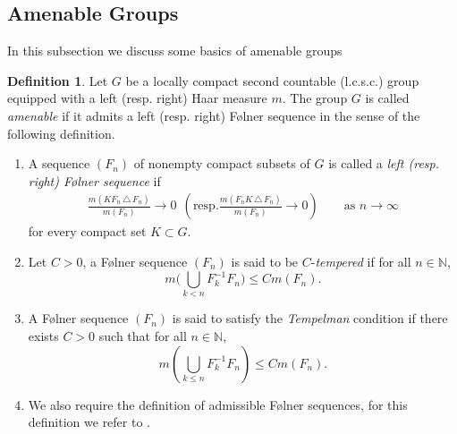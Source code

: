 \documentclass[11pt]{amsart}
\theoremstyle{definition}
\newtheorem{defn}[thm]{Definition}
\theoremstyle{myremark}
\numberwithin{equation}{section}
\def\N{\mathbb N}
\begin{document}
\subsection{Amenable Groups}\label{amena}
In this subsection we discuss some basics of amenable groups
\begin{defn}
Let $G$ be a locally compact second countable (l.c.s.c.) group equipped with a left (resp. right) Haar measure $m$.
The group $G$ is called \emph{amenable} if it admits a left (resp. right) F\o lner sequence in the sense of the following definition.
\begin{enumerate}
\item[(i)] 
A sequence $(F_n)$ of nonempty compact subsets of $G$ is called a \emph{left (resp. right) F\o lner sequence} if
\begin{align*}
\frac{m(KF_n \,\triangle\, F_n)}{m(F_n)} \longrightarrow 0~~
(\text{resp.} \frac{m(F_nK \,\triangle\, F_n)}{m(F_n)} \longrightarrow 0)
\qquad \text{as } n \to \infty
\end{align*}
for every compact set $K \subset G$.
\item[(ii)] Let $ C> 0$, a  F\o lner sequence $(F_n)$ is said to be $C$-\textit{tempered}  if for all $n \in \N$, $$m\bigl(\bigcup_{k<n}F^{-1}_kF_n\bigr) \leq Cm(F_n).$$


\item[(iii)] A F\o lner sequence $(F_n)$ is said to satisfy the \textit{Tempelman} condition if there exists $C>0$ such that for all $n\in \N$, $$m(\bigcup_{k\leq n}F_k^{-1}F_n) \leq Cm(F_n).$$
\item[(iv)]  We also require the definition of admissible F\o lner sequences, for this definition we refer to \cite{cadilhac2022noncommutative}.
\end{enumerate}
\end{defn}
\end{document}
